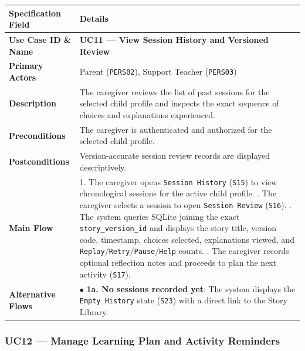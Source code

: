 \noindent\begin{xltabular}{\textwidth}{|p{4.0cm}|X|}
\hline
\textbf{Specification Field} & \textbf{Details} \\ \hline
\endhead
\textbf{Use Case ID \& Name} & \textbf{UC11 — View Session History and Versioned Review} \\ \hline
\textbf{Primary Actors} & Parent (\texttt{PERS02}), Support Teacher (\texttt{PERS03}) \\ \hline
\textbf{Description} & The caregiver reviews the list of past sessions for the selected child profile and inspects the exact sequence of choices and explanations experienced. \\ \hline
\textbf{Preconditions} & The caregiver is authenticated and authorized for the selected child profile. \\ \hline
\textbf{Postconditions} & Version-accurate session review records are displayed descriptively. \\ \hline
\textbf{Main Flow} & 1. The caregiver opens \texttt{Session History} (\texttt{S15}) to view chronological sessions for the active child profile. . The caregiver selects a session to open \texttt{Session Review} (\texttt{S16}). . The system queries SQLite joining the exact \texttt{story\_version\_id} and displays the story title, version code, timestamp, choices selected, explanations viewed, and \texttt{Replay}/\texttt{Retry}/\texttt{Pause}/\texttt{Help} counts. . The caregiver records optional reflection notes and proceeds to plan the next activity (\texttt{S17}). \\ \hline
\textbf{Alternative Flows} & $\bullet$ \textbf{1a. No sessions recorded yet}: The system displays the \texttt{Empty History} state (\texttt{S23}) with a direct link to the Story Library. \\ \hline
\end{xltabular}



\subsubsection{UC12 — Manage Learning Plan and Activity Reminders}


